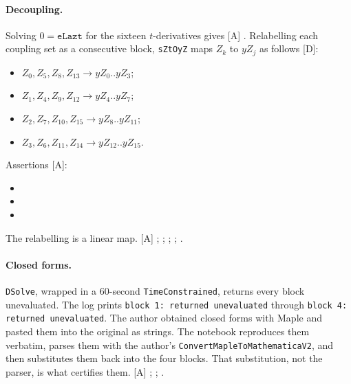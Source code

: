\paragraph{Decoupling.} Solving $0=\texttt{eLazt}$ for the sixteen $t$-derivatives gives [A]
. Relabelling each coupling set as a
consecutive block, \texttt{sZtOyZ} maps $Z_k$ to $yZ_j$ as follows [D]:
\begin{itemize}
  \item $Z_0,Z_5,Z_8,Z_{13}\to yZ_0..yZ_3$;
  \item $Z_1,Z_4,Z_9,Z_{12}\to yZ_4..yZ_7$;
  \item $Z_2,Z_7,Z_{10},Z_{15}\to yZ_8..yZ_{11}$;
  \item $Z_3,Z_6,Z_{11},Z_{14}\to yZ_{12}..yZ_{15}$.
\end{itemize}
Assertions [A]:
\begin{itemize}
  \item {}
  \item {}
  \item {}
\end{itemize}
The relabelling is a linear map. [A] ;
; ;
;
.

\paragraph{Closed forms.} \texttt{DSolve}, wrapped in a 60-second \texttt{TimeConstrained},
returns every block unevaluated. The log prints \texttt{block 1: returned unevaluated} through
\texttt{block 4: returned unevaluated}. The author obtained closed forms with Maple and pasted
them into the original as strings. The notebook reproduces them verbatim, parses them with the
author's \texttt{ConvertMapleToMathematicaV2}, and then substitutes them back into the four
blocks. That substitution, not the parser, is what certifies them. [A]
; ;
.

